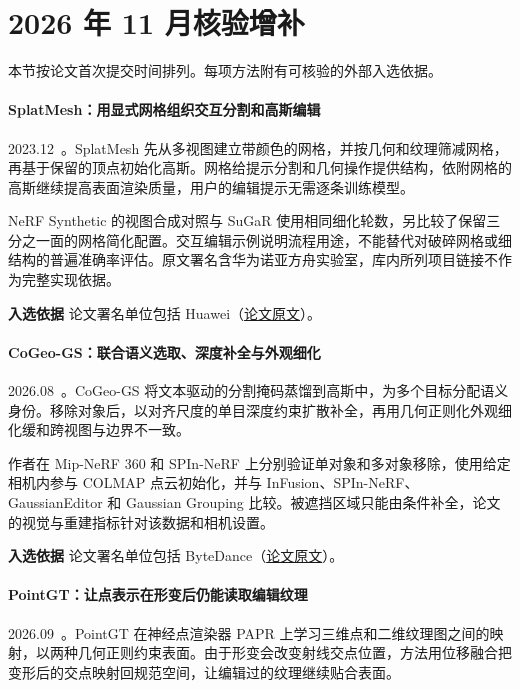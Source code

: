 \section{2026 年 11 月核验增补}

本节按论文首次提交时间排列。每项方法附有可核验的外部入选依据。

\paragraph{SplatMesh：用显式网格组织交互分割和高斯编辑}
2023.12~\cite{2312_15856}。SplatMesh 先从多视图建立带颜色的网格，并按几何和纹理筛减网格，再基于保留的顶点初始化高斯。网格给提示分割和几何操作提供结构，依附网格的高斯继续提高表面渲染质量，用户的编辑提示无需逐条训练模型。

NeRF Synthetic 的视图合成对照与 SuGaR 使用相同细化轮数，另比较了保留三分之一面的网格简化配置。交互编辑示例说明流程用途，不能替代对破碎网格或细结构的普遍准确率评估。原文署名含华为诺亚方舟实验室，库内所列项目链接不作为完整实现依据。

\textbf{入选依据} 论文署名单位包括 Huawei（\href{https://arxiv.org/abs/2312.15856}{论文原文}）。

\paragraph{CoGeo-GS：联合语义选取、深度补全与外观细化}
2026.08~\cite{2608_26656}。CoGeo-GS 将文本驱动的分割掩码蒸馏到高斯中，为多个目标分配语义身份。移除对象后，以对齐尺度的单目深度约束扩散补全，再用几何正则化外观细化缓和跨视图与边界不一致。

作者在 Mip-NeRF 360 和 SPIn-NeRF 上分别验证单对象和多对象移除，使用给定相机内参与 COLMAP 点云初始化，并与 InFusion、SPIn-NeRF、GaussianEditor 和 Gaussian Grouping 比较。被遮挡区域只能由条件补全，论文的视觉与重建指标针对该数据和相机设置。

\textbf{入选依据} 论文署名单位包括 ByteDance（\href{https://arxiv.org/abs/2608.26656}{论文原文}）。

\paragraph{PointGT：让点表示在形变后仍能读取编辑纹理}
2026.09~\cite{2609_03341}。PointGT 在神经点渲染器 PAPR 上学习三维点和二维纹理图之间的映射，以两种几何正则约束表面。由于形变会改变射线交点位置，方法用位移融合把变形后的交点映射回规范空间，让编辑过的纹理继续贴合表面。

